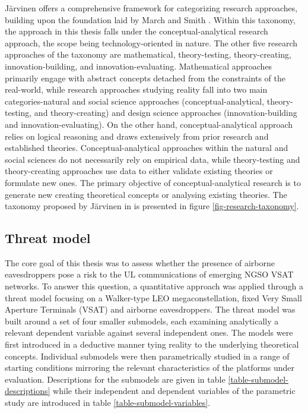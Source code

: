 \documentclass[english, 12pt, a4paper, elec, utf8, a-1b, online]{aaltothesis}
\begin{document}
Järvinen \cite{jarvinen2011tutkimustyon, jarvinen2004research} offers a comprehensive framework for categorizing research approaches, building upon the foundation laid by March and Smith \cite{march1995design}. Within this taxonomy, the approach in this thesis falls under the conceptual-analytical research approach, the scope being technology-oriented in nature.
The other five research approaches of the taxonomy are mathematical, theory-testing, theory-creating, innovation-building, and innovation-evaluating.
Mathematical approaches primarily engage with abstract concepts detached from the constraints of the real-world, while research approaches studying reality fall into two main categories-natural and social science approaches (conceptual-analytical, theory-testing, and theory-creating) and design science approaches (innovation-building and innovation-evaluating).
On the other hand, conceptual-analytical approach relies on logical reasoning and draws extensively from prior research and established theories. Conceptual-analytical approaches within the natural and social sciences do not necessarily rely on empirical data, while theory-testing and theory-creating approaches use data to either validate existing theories or formulate new ones. The primary objective of conceptual-analytical research is to generate new creating theoretical concepts or analysing existing theories.
The taxonomy proposed by Järvinen in \cite{jarvinen2011tutkimustyon, jarvinen2004research} is presented in figure \ref{fig-research-taxonomy}.

\subsection{Threat model}

The core goal of this thesis was to assess whether the presence of airborne eavesdroppers pose a risk to the UL communications of emerging NGSO VSAT networks.
To answer this question, a quantitative approach was applied through a threat model focusing on a Walker-type LEO megaconstellation, fixed Very Small Aperture Terminals (VSAT) and airborne eavesdroppers.
The threat model was built around a set of four smaller submodels, each examining analytically a relevant dependent variable against several independent ones.
The models were first introduced in a deductive manner tying reality to the underlying theoretical concepts.
Individual submodels were then parametrically studied in a range of starting conditions mirroring the relevant characteristics of the platforms under evaluation.
Descriptions for the submodels are given in table \ref{table-submodel-descriptions} while their independent and dependent variables of the parametric study are introduced in table \ref{table-submodel-variables}.
\end{document}
